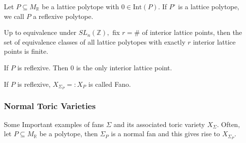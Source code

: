\documentclass[a4paper,12pt]{amsart}
\newcommand{\R}{\ensuremath{\mathbb{R}}}
\newcommand{\Z}{\ensuremath{\mathbb{Z}}}
\begin{document}
\begin{definition}
	Let $P\subseteq M_\R$ be a lattice polytope with $0\in \text{Int}(P).$ If $P^\circ$ is a lattice polytope, we call $P$ a reflexive polytope. 
\end{definition}
\begin{theorem}
	Up to equivalence under $SL_n(\Z),$ fix $r=\#$ of interior lattice points, then the set of equivalence classes of all lattice polytopes with exactly $r$ interior lattice points is finite. 
\end{theorem}
\begin{corollary}
	If $P$ is reflexive. Then $0$ is the only interior lattice point. 
\end{corollary}

\begin{definition}
	If $P$ is reflexive, $X_{\Sigma_P}=:X_P$ is called Fano. 
\end{definition}

\subsubsection*{Normal Toric Varieties}
Some  Important examples of fans $\Sigma$ and its associated toric variety $X_\Sigma.$ Often, let $P\subseteq M_\R$ be a polytope, then $\Sigma_P$ is a normal fan and this gives rise to $X_{\Sigma_P}.$ 
\end{document}
